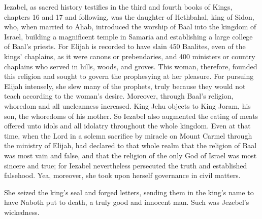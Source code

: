 Iezabel, as sacred history testifies in the third and fourth books of Kings, chapters 16 and 17 and following, was the daughter of Hethbahal, king of Sidon, who, when married to Ahab, introduced the worship of Baal into the kingdom of Israel, building a magnificent temple in Samaria and establishing a large college of Baal’s priests. For Elijah is recorded to have slain 450 Baalites, even of the kings’ chaplains, as it were canons or prebendaries, and 400 ministers or country chaplains who served in hills, woods, and groves. This woman, therefore, founded this religion and sought to govern the prophesying at her pleasure. For pursuing Elijah intensely, she slew many of the prophets, truly because they would not teach according to the woman’s desire. Moreover, through Baal’s religion, whoredom and all uncleanness increased. King Jehu objects to King Joram, his son, the whoredoms of his mother. So Iezabel also augmented the eating of meats offered unto idols and all idolatry throughout the whole kingdom. Even at that time, when the Lord in a solemn sacrifice by miracle on Mount Carmel through the ministry of Elijah, had declared to that whole realm that the religion of Baal was most vain and false, and that the religion of the only God of Israel was most sincere and true; for Iezabel nevertheless persecuted the truth and established falsehood. Yea, moreover, she took upon herself governance in civil matters.

She seized the king’s seal and forged letters, sending them in the king’s name to have Naboth put to death, a truly good and innocent man. Such was Jezebel’s wickedness.

